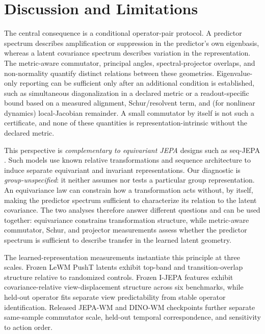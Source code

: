 \documentclass{article}
\begin{document}
\FloatBarrier
\section{Discussion and Limitations}

The central consequence is a conditional operator-pair protocol. A predictor spectrum describes amplification or suppression in the predictor's own eigenbasis, whereas a latent covariance spectrum describes variation in the representation. The metric-aware commutator, principal angles, spectral-projector overlaps, and non-normality quantify distinct relations between these geometries. Eigenvalue-only reporting can be sufficient only after an additional condition is established, such as simultaneous diagonalization in a declared metric or a readout-specific bound based on a measured alignment, Schur/resolvent term, and (for nonlinear dynamics) local-Jacobian remainder. A small commutator by itself is not such a certificate, and none of these quantities is representation-intrinsic without the declared metric.

This perspective is \emph{complementary to equivariant JEPA} designs such as seq-JEPA \citep{ghaemi2025seqjepa}. Such models use known relative transformations and sequence architecture to induce separate equivariant and invariant representations. Our diagnostic is \emph{group-unspecified}: it neither assumes nor tests a particular group representation. An equivariance law can constrain how a transformation acts without, by itself, making the predictor spectrum sufficient to characterize its relation to the latent covariance. The two analyses therefore answer different questions and can be used together: equivariance constrains transformation structure, while metric-aware commutator, Schur, and projector measurements assess whether the predictor spectrum is sufficient to describe transfer in the learned latent geometry.

The learned-representation measurements instantiate this principle at three scales. Frozen LeWM PushT latents exhibit top-band and transition-overlap structure relative to randomized controls. Frozen I-JEPA features exhibit covariance-relative view-displacement structure across six benchmarks, while held-out operator fits separate view predictability from stable operator identification. Released JEPA-WM and DINO-WM checkpoints further separate same-sample commutator scale, held-out temporal correspondence, and sensitivity to action order.
\end{document}
